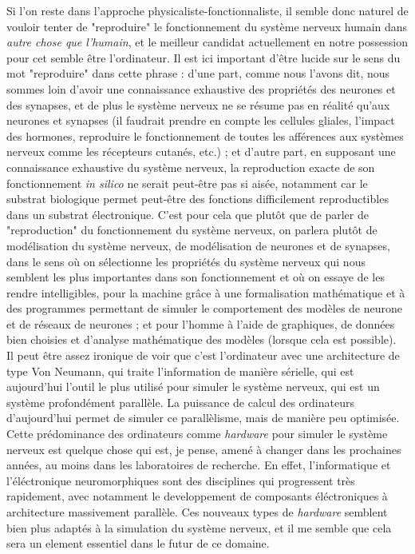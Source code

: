 \documentclass[12pt]{scrartcl}
\begin{document}
Si l'on reste dans l'approche physicaliste-fonctionnaliste, il semble donc naturel de vouloir tenter de "reproduire" le fonctionnement du système nerveux humain dans \textit{autre chose que l'humain}, et le meilleur candidat actuellement en notre possession pour cet  semble être l'ordinateur. Il est ici important d'être lucide sur le sens du mot "reproduire" dans cette phrase : d'une part, comme nous l'avons dit, nous sommes loin d'avoir une connaissance exhaustive des propriétés des neurones et des synapses, et de plus le système nerveux ne se résume pas en réalité qu'aux neurones et synapses (il faudrait prendre en compte les cellules gliales, l'impact des hormones, reproduire le fonctionnement de toutes les afférences aux systèmes nerveux comme les récepteurs cutanés, etc.) ; et d'autre part, en supposant une connaissance exhaustive du système nerveux, la reproduction exacte de son fonctionnement \textit{in silico} ne serait peut-être pas si aisée, notamment car le substrat biologique permet peut-être des fonctions difficilement reproductibles dans un substrat électronique. C'est pour cela que plutôt que de parler de "reproduction" du fonctionnement du système nerveux, on parlera plutôt de modélisation du système nerveux, de modélisation de neurones et de synapses, dans le sens où on sélectionne les propriétés du système nerveux qui nous semblent les plus importantes dans son fonctionnement et où on essaye de les rendre intelligibles, pour la machine grâce à une formalisation mathématique et à des programmes permettant de simuler le comportement des modèles de neurone et de réseaux de neurones ; et pour l'homme à l'aide de graphiques, de données bien choisies et d'analyse mathématique des modèles (lorsque cela est possible).\\

Il peut être assez ironique de voir que c'est l'ordinateur avec une architecture de type Von Neumann, qui traite l'information de manière sérielle, qui est aujourd'hui l'outil le plus utilisé pour simuler le système nerveux, qui est un système profondément parallèle. La puissance de calcul des ordinateurs d'aujourd'hui permet de simuler ce parallèlisme, mais de manière peu optimisée. Cette prédominance des ordinateurs  comme \textit{hardware} pour simuler le système nerveux est quelque chose qui est, je pense, amené à changer dans les prochaines années, au moins dans les laboratoires de recherche. En effet, l'informatique et l'éléctronique neuromorphiques sont des disciplines qui progressent très rapidement, avec notamment le developpement de composants éléctroniques à architecture massivement parallèle. Ces nouveaux types de \textit{hardware} semblent bien plus adaptés à la simulation du système nerveux, et il me semble que cela sera un element essentiel dans le futur de ce domaine.\\
\end{document}
